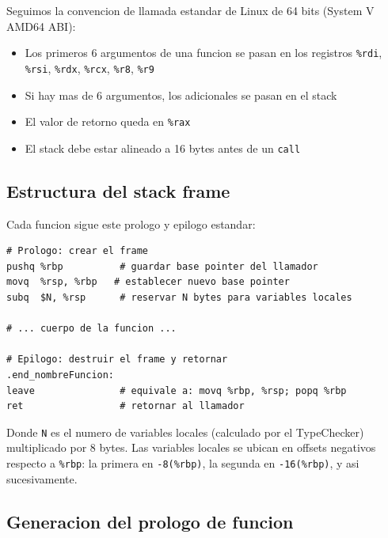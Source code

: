 \documentclass[12pt, a4paper]{article}
\begin{document}
Seguimos la convencion de llamada estandar de Linux de 64 bits (System V AMD64 ABI):

\begin{itemize}
    \item Los primeros 6 argumentos de una funcion se pasan en los registros \texttt{\%rdi}, \texttt{\%rsi}, \texttt{\%rdx}, \texttt{\%rcx}, \texttt{\%r8}, \texttt{\%r9}
    \item Si hay mas de 6 argumentos, los adicionales se pasan en el stack
    \item El valor de retorno queda en \texttt{\%rax}
    \item El stack debe estar alineado a 16 bytes antes de un \texttt{call}
\end{itemize}

\subsection{Estructura del stack frame}

Cada funcion sigue este prologo y epilogo estandar:

\begin{lstlisting}[style=asmstyle, caption={Stack frame de una funcion en x86-64}]
# Prologo: crear el frame
pushq %rbp          # guardar base pointer del llamador
movq  %rsp, %rbp   # establecer nuevo base pointer
subq  $N, %rsp      # reservar N bytes para variables locales

# ... cuerpo de la funcion ...

# Epilogo: destruir el frame y retornar
.end_nombreFuncion:
leave               # equivale a: movq %rbp, %rsp; popq %rbp
ret                 # retornar al llamador
\end{lstlisting}

Donde \texttt{N} es el numero de variables locales (calculado por el TypeChecker) multiplicado por 8 bytes. Las variables locales se ubican en offsets negativos respecto a \texttt{\%rbp}: la primera en \texttt{-8(\%rbp)}, la segunda en \texttt{-16(\%rbp)}, y asi sucesivamente.

\subsection{Generacion del prologo de funcion}
\end{document}

